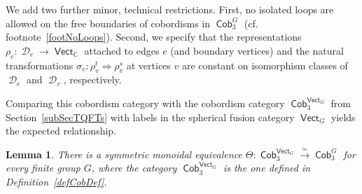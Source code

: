 \documentclass[10pt,a4paper]{amsart}
\DeclareMathOperator{\vect}{\mathsf{Vect}}
\DeclareMathOperator{\C}{\mathbb{C}}
\DeclareMathOperator{\Cob}{\mathsf{Cob}}
\DeclareMathOperator{\cald}{\mathcal{D}}
\numberwithin{equation}{section}
\newtheorem{Lemma}[Lemma]{Lemma}
\theoremstyle{definition}
\begin{document}
We add two further minor, technical restrictions.
First, no isolated loops are allowed on the free boundaries of cobordisms in $\Cob_3^G$ (cf. footnote~\ref{footNoLoops}). Second, we specify that the representations $\rho_e \colon \cald_e \rightarrow \vect_{\C}$ attached to edges $e$ (and boundary vertices) and the natural transformations $\sigma_v \colon \rho_v^t \Rightarrow \rho_v^s$ at vertices $v$ are constant on isomorphism classes of $\cald_e$ and $\cald_v$, respectively.

Comparing this cobordism category with the cobordism category $\Cob_3^{\vect_G}$ from Section~\ref{subSecTQFTs} with labels in the spherical fusion category $\vect_G$ yields the expected relationship.
\begin{Lemma}\label{lemEqCob}
 There is a symmetric monoidal equivalence $\Theta\colon \Cob_3^{\vect_G} \xrightarrow{\simeq} \Cob_3^G$ for every finite group $G$, where the category $\Cob_3^{\vect_G}$ is the one defined in Definition~{\rm \ref{defCobDef}}.
\end{Lemma}
\end{document}
